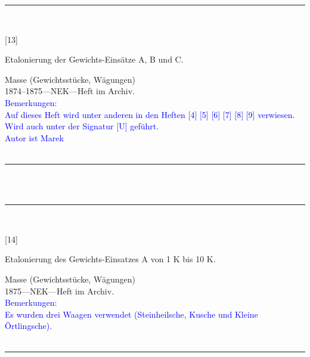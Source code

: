 \parbox{\textwidth}{%
\rule{\textwidth}{1pt}\vspace*{-3mm}\\
\begin{minipage}[t]{0.15\textwidth}\vspace{0pt}
\Huge\rule[-4mm]{0cm}{1cm}[13]
\end{minipage}
\hfill
\begin{minipage}[t]{0.85\textwidth}\vspace{0pt}
\large Etalonierung der Gewichts-Einsätze A, B und C.\rule[-2mm]{0mm}{2mm}
\end{minipage}
{\footnotesize\flushright
Masse (Gewichtsstücke, Wägungen)\\
}
1874--1875\quad---\quad NEK\quad---\quad Heft im Archiv.\\
\textcolor{blue}{Bemerkungen:\\{}
Auf dieses Heft wird unter anderen in den Heften [4] [5] [6] [7] [8] [9] verwiesen.\\{}
Wird auch unter der Signatur [U] geführt.\\{}
Autor ist Marek\\{}
}
\\[-15pt]
\rule{\textwidth}{1pt}
}
\\
\vspace*{-2.5pt}\\
\parbox{\textwidth}{%
\rule{\textwidth}{1pt}\vspace*{-3mm}\\
\begin{minipage}[t]{0.15\textwidth}\vspace{0pt}
\Huge\rule[-4mm]{0cm}{1cm}[14]
\end{minipage}
\hfill
\begin{minipage}[t]{0.85\textwidth}\vspace{0pt}
\large Etalonierung des Gewichts-Einsatzes {\glqq}A{\grqq} von 1 K bis 10 K.\rule[-2mm]{0mm}{2mm}
\end{minipage}
{\footnotesize\flushright
Masse (Gewichtsstücke, Wägungen)\\
}
1875\quad---\quad NEK\quad---\quad Heft im Archiv.\\
\textcolor{blue}{Bemerkungen:\\{}
Es wurden drei Waagen verwendet (Steinheilsche, Kusche und Kleine Örtlingsche).\\{}
}
\\[-15pt]
\rule{\textwidth}{1pt}
}
\\
